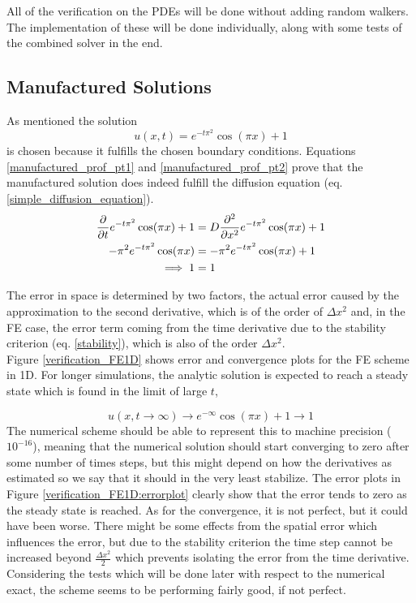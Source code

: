 All of the verification on the PDEs will be done without adding random walkers. The implementation of these will be done individually, along with some tests of the combined solver in the end.

\subsection{Manufactured Solutions}

As mentioned the solution
\begin{equation}\label{manifactured_solution_1D}
 u(x,t) = e^{-t\pi^2}\cos(\pi x) +1
\end{equation}
is chosen because it fulfills the chosen boundary conditions.
Equations \eqref{manufactured_prof_pt1} and \eqref{manufactured_prof_pt2} prove that the manufactured solution does indeed fulfill the diffusion equation (eq. \ref{simple_diffusion_equation}).
\begin{align}
 \frac{\partial }{\partial t}e^{-t\pi^2}\cos(\pi x) +1 &= D\frac{\partial^2}{\partial x^2}e^{-t\pi^2}\cos(\pi x) +1\label{manufactured_prof_pt1}\\
 -\pi^2e^{-t\pi^2}\cos(\pi x) &= -\pi^2e^{-t\pi^2}\cos(\pi x) +1 \label{manufactured_prof_pt2}\\
 \implies 1 &= 1 \nonumber
\end{align}

The error in space is determined by two factors, the actual error caused by the approximation to the second derivative, which is of the order of $\Delta x^2$ and, in the FE case, the error term coming from the time derivative due to the stability criterion (eq. \ref{stability}), which is also of the order $\Delta x^2$. \\
Figure \ref{verification_FE1D} shows error and convergence plots for the FE scheme in 1D. 
For longer simulations, the analytic solution is expected to reach a steady state which is found in the limit of large $t$, 

\begin{equation}
 u(x,t\to\infty) \to e^{-\infty}\cos(\pi x) +1 \to 1
\end{equation}
The numerical scheme should be able to represent this to machine precision ($10^{-16}$), meaning that the numerical solution should start converging to zero after some number of times steps, but this might depend on how the derivatives as estimated so we say that it should in the very least stabilize. 
The error plots in Figure \ref{verification_FE1D:errorplot} clearly show that the error tends to zero as the steady state is reached. 
As for the convergence, it is not perfect, but it could have been worse. There might be some effects from the spatial error which influences the error, but due to the stability criterion the time step cannot be increased beyond $\frac{\Delta x^2}{2}$ which prevents isolating the error from the time derivative. 
Considering the tests which will be done later with respect to the numerical exact, the scheme seems to be performing fairly good, if not perfect.

